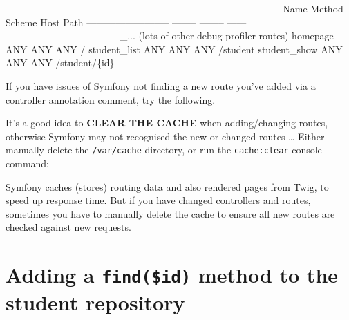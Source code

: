 \documentclass[a4paperpaper,openright]{book}
\newenvironment{Shaded}{}{}
\newcommand{\DataTypeTok}[1]{\textcolor[rgb]{0.56,0.13,0.00}{#1}}
\newcommand{\ExtensionTok}[1]{#1}
\newcommand{\NormalTok}[1]{#1}
\newcommand{\StringTok}[1]{\textcolor[rgb]{0.25,0.44,0.63}{#1}}
\begin{document}
\begin{Shaded}
\begin{Highlighting}[]
     \ExtensionTok{--------------------------}\NormalTok{ -------- -------- ------ -----------------------------------}
      \ExtensionTok{Name}\NormalTok{                       Method   Scheme   Host   Path}
     \ExtensionTok{--------------------------}\NormalTok{ -------- -------- ------ -----------------------------------}
      \ExtensionTok{_...}\NormalTok{ (lots of other debug profiler routes)}
      \ExtensionTok{homepage}\NormalTok{                   ANY      ANY      ANY    /}
      \ExtensionTok{student_list}\NormalTok{               ANY      ANY      ANY    /student}
      \ExtensionTok{student_show}\NormalTok{               ANY      ANY      ANY    /student/}\DataTypeTok{\{id\}}
\end{Highlighting}
\end{Shaded}

If you have issues of Symfony not finding a new route you've added via a
controller annotation comment, try the following.

It's a good idea to \textbf{CLEAR THE CACHE} when adding/changing
routes, otherwise Symfony may not recognised the new or changed routes
\ldots{} Either manually delete the \texttt{/var/cache} directory, or
run the \texttt{cache:clear} console command:

\begin{Shaded}
\end{Shaded}

Symfony caches (stores) routing data and also rendered pages from Twig,
to speed up response time. But if you have changed controllers and
routes, sometimes you have to manually delete the cache to ensure all
new routes are checked against new requests.

\hypertarget{adding-a-findid-method-to-the-student-repository}{%
\section{\texorpdfstring{Adding a \texttt{find(\$id)} method to the
student
repository}{Adding a find(\$id) method to the student repository}}\label{adding-a-findid-method-to-the-student-repository}}
\end{document}
